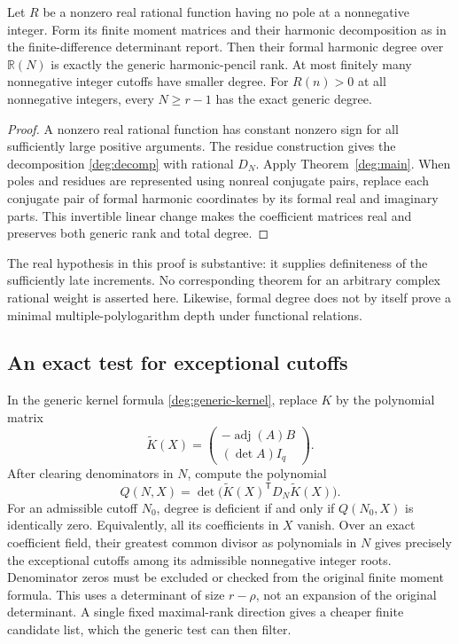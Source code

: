 \begin{corollary}
\label{deg:rational}
Let $R$ be a nonzero real rational function having no pole at a
nonnegative integer.  Form its finite moment matrices and their
harmonic decomposition as in the finite-difference determinant report.
Then their formal harmonic degree over $\mathbb R(N)$ is exactly the
generic harmonic-pencil rank.  At most finitely many nonnegative
integer cutoffs have smaller degree.  For $R(n)>0$ at all
nonnegative integers, every $N\ge r-1$ has the exact generic degree.
\end{corollary}
\begin{proof}
A nonzero real rational function has constant nonzero sign for all
sufficiently large positive arguments.  The residue construction gives
the decomposition \eqref{deg:decomp} with rational $D_N$.  Apply
Theorem~\ref{deg:main}.  When poles and residues are represented using
nonreal conjugate pairs, replace each conjugate pair of formal harmonic
coordinates by its formal real and imaginary parts.  This invertible
linear change makes the coefficient matrices real and preserves both
generic rank and total degree.
\end{proof}

The real hypothesis in this proof is substantive: it supplies definiteness
of the sufficiently late increments.  No corresponding theorem for an
arbitrary complex rational weight is asserted here.  Likewise, formal
degree does not by itself prove a minimal multiple-polylogarithm depth
under functional relations.

\subsection{An exact test for exceptional cutoffs}

In the generic kernel formula \eqref{deg:generic-kernel}, replace $K$ by
the polynomial matrix
\[
 \widetilde K(X)=
 \begin{pmatrix}-\operatorname{adj}(A)B\\(\det A)I_q\end{pmatrix}.
\]
After clearing denominators in $N$, compute the polynomial
\begin{equation}\label{deg:exception-certificate}
 Q(N,X)=\det\bigl(\widetilde K(X)^{\mathsf T}D_N
                                      \widetilde K(X)\bigr).
\end{equation}
For an admissible cutoff $N_0$, degree is deficient if and only if
$Q(N_0,X)$ is identically zero.  Equivalently, all its coefficients in
$X$ vanish.  Over an exact coefficient field, their greatest common
divisor as polynomials in $N$ gives precisely the exceptional cutoffs
among its admissible nonnegative integer roots.  Denominator zeros must
be excluded or checked from the original finite moment formula.  This
uses a determinant of size $r-\rho$, not an expansion of the original
determinant.  A single fixed maximal-rank direction gives a cheaper
finite candidate list, which the generic test can then filter.

